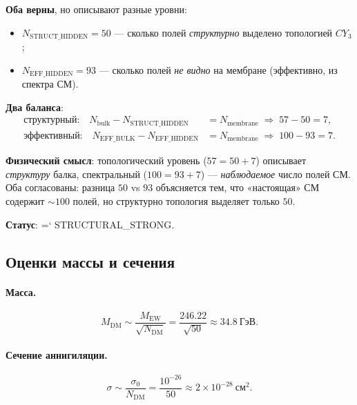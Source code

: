\documentclass[11pt,a4paper]{article}
\newcommand{\CY}{CY_3}
\newcommand{\MEW}{M_{\text{EW}}}
\renewcommand{\texttt}[1]{{\ttfamily\hyphenchar\font=`\- #1}}
\theoremstyle{definition}
\begin{document}
\noindent
\textbf{Оба верны}, но описывают разные уровни:
\begin{itemize}
    \item $N_{\text{STRUCT\_HIDDEN}} = 50$ — сколько полей \emph{структурно}
          выделено топологией $\CY$;
    \item $N_{\text{EFF\_HIDDEN}} = 93$ — сколько полей \emph{не видно}
          на мембране (эффективно, из спектра СМ).
\end{itemize}

\medskip\noindent
\textbf{Два баланса}:
\begin{align}
    \text{структурный:} \quad
    N_{\text{bulk}} - N_{\text{STRUCT\_HIDDEN}} &= N_{\text{membrane}}
    \;\Rightarrow\; 57 - 50 = 7, \\
    \text{эффективный:} \quad
    N_{\text{EFF\_BULK}} - N_{\text{EFF\_HIDDEN}} &= N_{\text{membrane}}
    \;\Rightarrow\; 100 - 93 = 7.
\end{align}

\medskip\noindent
\textbf{Физический смысл}: топологический уровень ($57 = 50 + 7$)
описывает \emph{структуру} балка, спектральный ($100 = 93 + 7$) —
\emph{наблюдаемое} число полей СМ.
Оба согласованы: разница $50$ vs $93$ объясняется тем, что
«настоящая» СМ содержит $\sim 100$ полей, но структурно
топология выделяет только $50$.

\medskip\noindent
\textbf{Статус}: \texttt{STRUCTURAL\_STRONG}.
\subsection{Оценки массы и сечения}
\label{subsec:dm-estimates}

\paragraph{Масса.}
\begin{equation}
    \boxed{
    M_{\text{DM}} \sim \frac{\MEW}{\sqrt{N_{\text{DM}}}}
    = \frac{246.22}{\sqrt{50}} \approx 34.8~\text{ГэВ}.
    }
    \label{eq:dm-mass}
\end{equation}

\paragraph{Сечение аннигиляции.}
\begin{equation}
    \sigma \sim \frac{\sigma_0}{N_{\text{DM}}}
    = \frac{10^{-26}}{50} \approx 2 \times 10^{-28}~\text{см}^2.
\end{equation}
\end{document}
